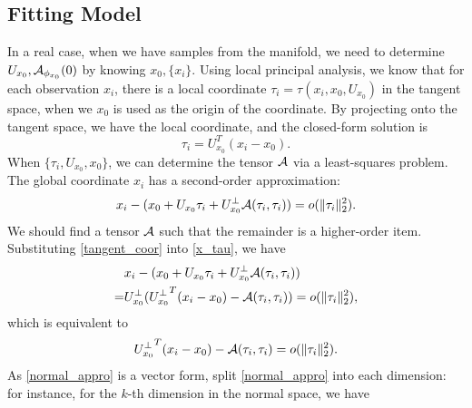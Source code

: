 \documentclass{article}
\theoremstyle{remark}
\begin{document}
\subsection{Fitting Model}
In a real case, when we have samples from the manifold, we need to determine  $U_{x_0}, {\cal A}_{\phi_{x_0}}(0)$ by knowing $x_0, \{x_i\}$.
Using local principal analysis, we know that for each observation $x_i$, there is a local coordinate $\tau_i = \tau(x_i,x_0, U_{x_0})$ in the tangent space, when we $x_0$ is used as the origin of the coordinate. By projecting onto the tangent space, we have the local coordinate, and the closed-form solution is
\begin{equation}\label{tangent_coor}
\tau_i = U_{x_0}^T (x_i -x_0).
\end{equation}
When $\{\tau_i, U_{x_0}, x_0\}$, we can determine the tensor $\cal A$ via a least-squares problem. The global coordinate $x_i$ has a second-order approximation:
\begin{equation}\label{x_tau}
 x_i  -  (x_0+ U_{x_0} \tau_i + U_{x_0}^{\perp} {\cal A}(\tau_i,\tau_i)) = o(\|\tau_i\|_2^2).
\end{equation}
We should find a tensor $\cal A$ such that the remainder is a higher-order item.
Substituting \eqref{tangent_coor} into \eqref{x_tau}, we have
\[
\begin{aligned}
 &x_i  -  (x_0+ U_{x_0} \tau_i + U_{x_0}^{\perp} {\cal A}(\tau_i,\tau_i))\\
 =&U_{x_0}^\perp( {U_{x_0}^\perp}^T (x_i -x_0) -{\cal A}(\tau_i,\tau_i) )= o(\|\tau_i\|_2^2),
 \end{aligned}
\]
which is equivalent to 
\begin{equation}\label{normal_appro}
 {U_{x_0}^\perp}^T (x_i -x_0) -{\cal A}(\tau_i,\tau_i) = o(\|\tau_i\|_2^2).
\end{equation}
As \eqref{normal_appro} is a vector form, split \eqref{normal_appro} into each dimension: for instance, for the $k$-th dimension in the normal space, we have
\end{document}
